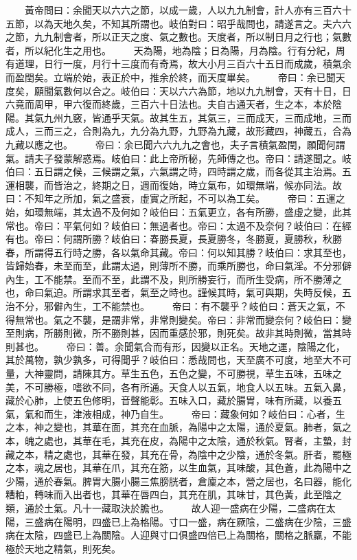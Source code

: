 　　黃帝問曰：余聞天以六六之節，以成一歲，人以九九制會，計人亦有三百六十五節，以為天地久矣，不知其所謂也。岐伯對曰：昭乎哉問也，請遂言之。夫六六之節，九九制會者，所以正天之度、氣之數也。天度者，所以制日月之行也；氣數者，所以紀化生之用也。
　　天為陽，地為陰；日為陽，月為陰。行有分紀，周有道理，日行一度，月行十三度而有奇焉，故大小月三百六十五日而成歲，積氣余而盈閏矣。立端於始，表正於中，推余於終，而天度畢矣。
　　帝曰：余已聞天度矣，願聞氣數何以合之。岐伯曰：天以六六為節，地以九九制會，天有十日，日六竟而周甲，甲六復而終歲，三百六十日法也。夫自古通天者，生之本，本於陰陽。其氣九州九竅，皆通乎天氣。故其生五，其氣三，三而成天，三而成地，三而成人，三而三之，合則為九，九分為九野，九野為九藏，故形藏四，神藏五，合為九藏以應之也。
　　帝曰：余已聞六六九九之會也，夫子言積氣盈閏，願聞何謂氣。請夫子發蒙解惑焉。岐伯曰：此上帝所秘，先師傳之也。帝曰：請遂聞之。岐伯曰：五日謂之候，三候謂之氣，六氣謂之時，四時謂之歲，而各從其主治焉。五運相襲，而皆治之，終期之日，週而復始，時立氣布，如環無端，候亦同法。故曰：不知年之所加，氣之盛衰，虛實之所起，不可以為工矣。
　　帝曰：五運之始，如環無端，其太過不及何如？岐伯曰：五氣更立，各有所勝，盛虛之變，此其常也。帝曰：平氣何如？岐伯曰：無過者也。帝曰：太過不及奈何？岐伯曰：在經有也。帝曰：何謂所勝？岐伯曰：春勝長夏，長夏勝冬，冬勝夏，夏勝秋，秋勝春，所謂得五行時之勝，各以氣命其藏。帝曰：何以知其勝？岐伯曰：求其至也，皆歸始春，未至而至，此謂太過，則薄所不勝，而乘所勝也，命曰氣淫。不分邪僻內生，工不能禁。至而不至，此謂不及，則所勝妄行，而所生受病，所不勝薄之也，命曰氣迫。所謂求其至者，氣至之時也。謹候其時，氣可與期，失時反候，五治不分，邪僻內生，工不能禁也。
　　帝曰：有不襲乎？岐伯曰：蒼天之氣，不得無常也。氣之不襲，是謂非常，非常則變矣。帝曰：非常而變奈何？岐伯曰：變至則病，所勝則微，所不勝則甚，因而重感於邪，則死矣。故非其時則微，當其時則甚也。
　　帝曰：善。余聞氣合而有形，因變以正名。天地之運，陰陽之化，其於萬物，孰少孰多，可得聞乎？岐伯曰：悉哉問也，天至廣不可度，地至大不可量，大神靈問，請陳其方。草生五色，五色之變，不可勝視，草生五味，五味之美，不可勝極，嗜欲不同，各有所通。天食人以五氣，地食人以五味。五氣入鼻，藏於心肺，上使五色修明，音聲能彰。五味入口，藏於腸胃，味有所藏，以養五氣，氣和而生，津液相成，神乃自生。
　　帝曰：藏象何如？岐伯曰：心者，生之本，神之變也，其華在面，其充在血脈，為陽中之太陽，通於夏氣。肺者，氣之本，魄之處也，其華在毛，其充在皮，為陽中之太陰，通於秋氣。腎者，主蟄，封藏之本，精之處也，其華在發，其充在骨，為陰中之少陰，通於冬氣。肝者，罷極之本，魂之居也，其華在爪，其充在筋，以生血氣，其味酸，其色蒼，此為陽中之少陽，通於春氣。脾胃大腸小腸三焦膀胱者，倉廩之本，營之居也，名曰器，能化糟粕，轉味而入出者也，其華在唇四白，其充在肌，其味甘，其色黃，此至陰之類，通於土氣。凡十一藏取決於膽也。
　　故人迎一盛病在少陽，二盛病在太陽，三盛病在陽明，四盛已上為格陽。寸口一盛，病在厥陰，二盛病在少陰，三盛病在太陰，四盛已上為關陰。人迎與寸口俱盛四倍已上為關格，關格之脈羸，不能極於天地之精氣，則死矣。


